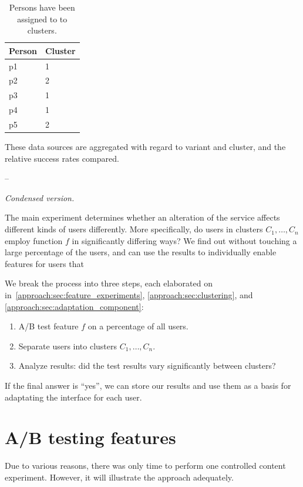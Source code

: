 \begin{table}[h]
  \centering
  \begin{tabular}{|ll|}
    \hline
    Person & Cluster \\ \hline
    p1     & 1 \\
    p2     & 2 \\
    p3     & 1 \\
    p4     & 1 \\
    p5     & 2 \\ \hline
  \end{tabular}
  \caption{Persons have been assigned to to clusters.}
  \label{tab:person_clusters}
\end{table}

These data sources are aggregated with regard to variant and cluster, and the relative success rates compared.

--

\emph{Condensed version.}

The main experiment determines whether an alteration of the service affects different kinds of users differently.
More specifically, do users in clusters $C_1, \ldots, C_n$ employ function $f$ in significantly differing ways? We find out without touching a large percentage of the users, and can use the results to individually enable features for users that

We break the process into three steps, each elaborated on in~\ref{approach:sec:feature_experiments}, \ref{approach:sec:clustering}, and \ref{approach:sec:adaptation_component}:

\begin{enumerate}
  \item A/B test feature $f$ on a percentage of all users.
  \item Separate users into clusters $C_1, \ldots, C_n$.
  \item Analyze results: did the test results vary significantly between clusters?
\end{enumerate}

If the final answer is ``yes'', we can store our results and use them as a basis for adaptating the interface for each user.

\section{A/B testing features} %
\label{eval:sec:ab_testing_features}

Due to various reasons, there was only time to perform one controlled content experiment. However, it will illustrate the approach adequately.

